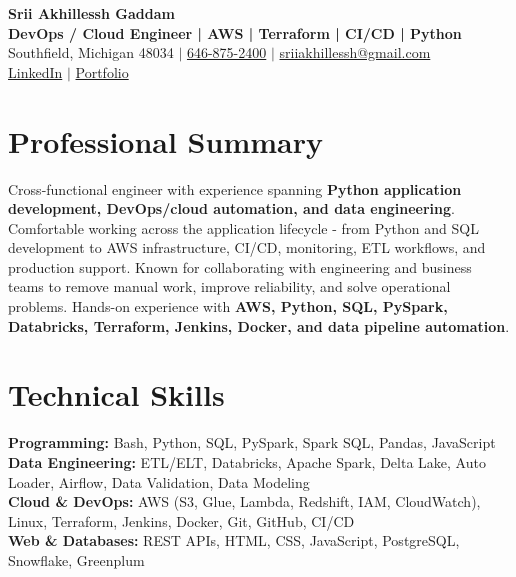 \documentclass[letterpaper,10pt]{article}
\begin{document}
\fontsize{9.35pt}{10.45pt}\selectfont

\begin{center}
    {\LARGE \textbf{Srii Akhillessh Gaddam}} \\[-1pt]
    \textbf{DevOps / Cloud Engineer | AWS | Terraform | CI/CD | Python} \\[2pt]
    Southfield, Michigan 48034 $|$
    \href{tel:6468752400}{646-875-2400} $|$
    \href{mailto:sriiakhillessh@gmail.com}{sriiakhillessh@gmail.com} \\[1pt]
    \href{https://www.linkedin.com/in/srii-akhiilessh-gaddam-b48668191/}{LinkedIn} $|$
    \href{https://sriiakhillesshg.github.io/portfolio/}{Portfolio}
\end{center}
\vspace{-8pt}

\section{Professional Summary}
\small{Cross-functional engineer with experience spanning \textbf{Python application development, DevOps/cloud automation, and data engineering}. Comfortable working across the application lifecycle - from Python and SQL development to AWS infrastructure, CI/CD, monitoring, ETL workflows, and production support. Known for collaborating with engineering and business teams to remove manual work, improve reliability, and solve operational problems. Hands-on experience with \textbf{AWS, Python, SQL, PySpark, Databricks, Terraform, Jenkins, Docker, and data pipeline automation}.}

\section{Technical Skills}
\small{
\textbf{Programming:} Bash, Python, SQL, PySpark, Spark SQL, Pandas, JavaScript \\
\textbf{Data Engineering:} ETL/ELT, Databricks, Apache Spark, Delta Lake, Auto Loader, Airflow, Data Validation, Data Modeling \\
\textbf{Cloud \& DevOps:} AWS (S3, Glue, Lambda, Redshift, IAM, CloudWatch), Linux, Terraform, Jenkins, Docker, Git, GitHub, CI/CD \\
\textbf{Web \& Databases:} REST APIs, HTML, CSS, JavaScript, PostgreSQL, Snowflake, Greenplum
}
\end{document}
